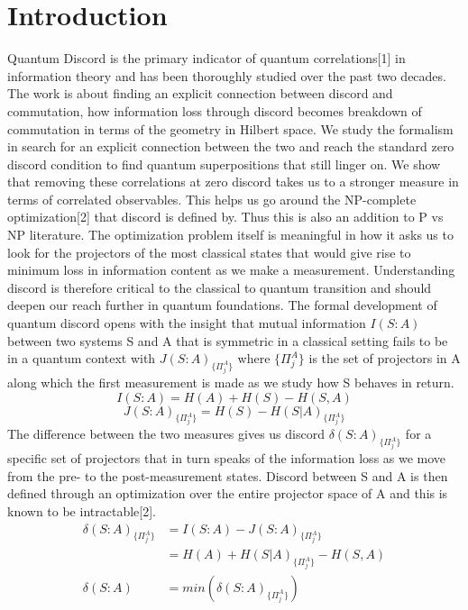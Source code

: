 \documentclass[8pt]{article}
\begin{document}
\section{Introduction}
Quantum Discord is the primary indicator of quantum correlations[1] in information theory and has been thoroughly studied over the past two decades. The work is about finding an explicit connection between discord and commutation, how information loss through discord becomes breakdown of commutation in terms of the geometry in Hilbert space. We study the formalism in search for an explicit connection between the two and reach the standard zero discord condition to find quantum superpositions that still linger on. We show that removing these correlations at zero discord takes us to a stronger measure in terms of correlated observables. This helps us go around the NP-complete optimization[2] that discord is defined by. Thus this is also an addition to P vs NP literature. The optimization problem itself is meaningful in how it asks us to look for the projectors of the most classical states that would give rise to minimum loss in information content as we make a measurement. Understanding discord is therefore critical to the classical to quantum transition and should deepen our reach further in quantum foundations. The formal development of quantum discord opens with the insight that mutual information $I(S:A)$ between two systems S and A that is symmetric in a classical setting fails to be in a quantum context with ${J(S:A)}_{\{{\Pi}^{A}_{j}\}}$ where ${\{{\Pi}^{A}_{j}\}}$ is the set of projectors in A along which the first measurement is made as we study how S behaves in return.
\[ I(S:A) = H(A) + H(S) - H(S,A)\]
\[{J(S:A)}_{\{{\Pi}^{A}_{j}\}} = H(S)-H(S|A)_{\{{\Pi}^{A}_{j}\}}\]
The difference between the two measures gives us discord $\delta(S:A)_ {\{{\Pi}^{A}_{j}\}}$ for a specific set of projectors that in turn speaks of the information loss as we move from the pre- to the post-measurement states. Discord between S and A is then defined through an optimization over the entire projector space of A and this is known to be intractable[2].
\begin{align*}
\delta(S:A)_ {\{{\Pi}^{A}_{j}\}} 
&= I(S:A)-{J(S:A)}_{\{{\Pi}^{A}_{j}\}}\\
&= H(A) + H(S|A)_{\{{\Pi}^{A}_{j}\}} - H(S,A)\\
\delta(S:A) &= min(\delta(S:A)_ {\{{\Pi}^{A}_{j}\}}) 
\end{align*}
\end{document}

